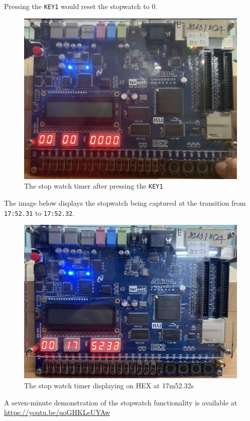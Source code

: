 \documentclass[12pt,a4paper,oneside]{book} %
\begin{document}
Pressing the \texttt{KEY1} would reset the stopwatch to 0.

 \begin{figure}[H]
    \begin{center}
    \includegraphics[width=.80\textwidth]{images/timer1.jpg}
    \caption{The stop watch timer after pressing the \texttt{KEY1}}
    \end{center}
\end{figure}

The image below displays the stopwatch being captured at the transition from \texttt{17:52.31} to \texttt{17:52.32}.

 \begin{figure}[H]
    \begin{center}
    \includegraphics[width=.80\textwidth]{images/timer3.jpg}
    \caption{The stop watch timer displaying on HEX at 17m52.32s}
    \end{center}
\end{figure}

A seven-minute demonstration of the stopwatch functionality is available at \url{https://youtu.be/uoGHKLeUYAw}
\end{document}

